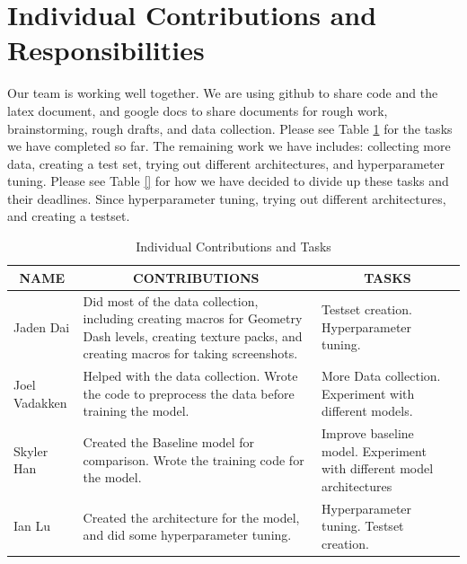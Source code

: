 \documentclass{article} %
\begin{document}
\section{Individual Contributions and Responsibilities}
\label{gen_inst}

Our team is working well together. We are using github to share code and the latex document, and google docs to share documents for rough work, brainstorming, rough drafts, and data collection. Please see Table \ref{table:contributions} for the tasks we have completed so far. The remaining work we have includes: collecting more data, creating a test set, trying out different architectures, and hyperparameter tuning.  Please see Table \ref{} for how we have decided to divide up these tasks and their deadlines. Since hyperparameter tuning, trying out different architectures, and creating a testset. 

\begin{table}[h]
\caption{Individual Contributions and Tasks}
\label{table:contributions}
\begin{center}
\begin{tabular}{|p{2cm}|p{6cm}|p{6cm}|}
\hline
\multicolumn{1}{|c|}{\bf NAME} & \multicolumn{1}{c|}{\bf CONTRIBUTIONS} & \multicolumn{1}{c|}{\bf TASKS}\\ \hline
Jaden Dai & Did most of the data collection, including creating macros for Geometry Dash levels, creating texture packs, and creating macros for taking screenshots. & Testset creation. Hyperparameter tuning.\\ \hline
Joel Vadakken & Helped with the data collection. Wrote the code to preprocess the data before training the model. & More Data collection. Experiment with different models.\\ \hline
Skyler Han & Created the Baseline model for comparison. Wrote the training code for the model. & Improve baseline model. Experiment with different model architectures\\ \hline 
Ian Lu & Created the architecture for the model, and did some hyperparameter tuning. & Hyperparameter tuning. Testset creation. \\ \hline
\end{tabular}
\end{center}
\end{table}
\end{document}
